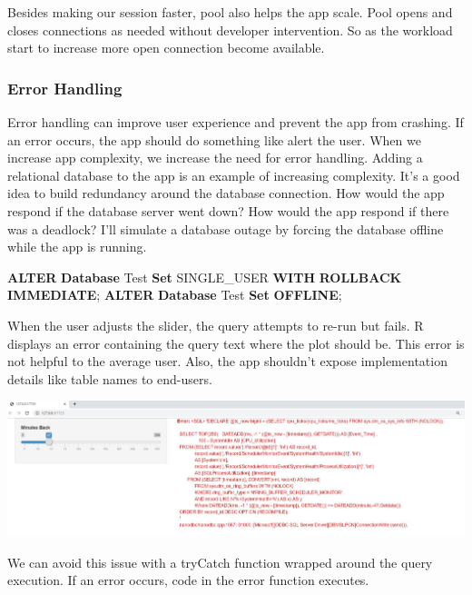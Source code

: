 \documentclass[]{article}
\newenvironment{Shaded}{\begin{snugshade}}{\end{snugshade}}
\newcommand{\KeywordTok}[1]{\textcolor[rgb]{0.13,0.29,0.53}{\textbf{#1}}}
\newcommand{\NormalTok}[1]{#1}
\begin{document}
Besides making our session faster, pool also helps the app scale. Pool
opens and closes connections as needed without developer intervention.
So as the workload start to increase more open connection become
available.

\hypertarget{error-handling}{%
\subsubsection{Error Handling}\label{error-handling}}

Error handling can improve user experience and prevent the app from
crashing. If an error occurs, the app should do something like alert the
user. When we increase app complexity, we increase the need for error
handling. Adding a relational database to the app is an example of
increasing complexity. It's a good idea to build redundancy around the
database connection. How would the app respond if the database server
went down? How would the app respond if there was a deadlock? I'll
simulate a database outage by forcing the database offline while the app
is running.

\begin{Shaded}
\begin{Highlighting}[]
\KeywordTok{ALTER} \KeywordTok{Database}\NormalTok{ Test }\KeywordTok{Set}\NormalTok{ SINGLE_USER }\KeywordTok{WITH} \KeywordTok{ROLLBACK} \KeywordTok{IMMEDIATE}\NormalTok{;}
\KeywordTok{ALTER} \KeywordTok{Database}\NormalTok{ Test }\KeywordTok{Set} \KeywordTok{OFFLINE}\NormalTok{;}
\end{Highlighting}
\end{Shaded}

When the user adjusts the slider, the query attempts to re-run but
fails. R displays an error containing the query text where the plot
should be. This error is not helpful to the average user. Also, the app
shouldn't expose implementation details like table names to end-users.

\includegraphics{./Images/ErrorMessage.JPG}

We can avoid this issue with a tryCatch function wrapped around the
query execution. If an error occurs, code in the error function
executes.
\end{document}
